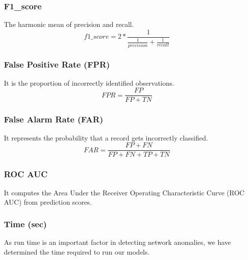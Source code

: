 \documentclass[14pt, conference]{IEEEtran}
\begin{document}
\subsubsection{F1\_score}
The harmonic mean of precision and recall.
\begin{equation}
    f1\_score = 2 * \frac{1}{\frac{1}{precision}+ \frac{1}{recall}}
\end{equation}

\subsubsection{False Positive Rate (FPR)}
It is the proportion of incorrectly identified observations.
\begin{equation}
    FPR = \frac{FP}{FP+TN}
\end{equation}

\subsubsection{False Alarm Rate (FAR)}
It represents the probability that a record gets incorrectly classified.
\begin{equation}
    FAR = \frac{FP+FN}{FP+FN+TP+TN}
\end{equation}

\subsubsection{ROC AUC}
It computes the Area Under the Receiver Operating Characteristic Curve (ROC AUC) from prediction scores.

\subsubsection{Time (sec)}
As run time is an important factor in detecting network anomalies, we have determined the time required to run our models.
\end{document}

